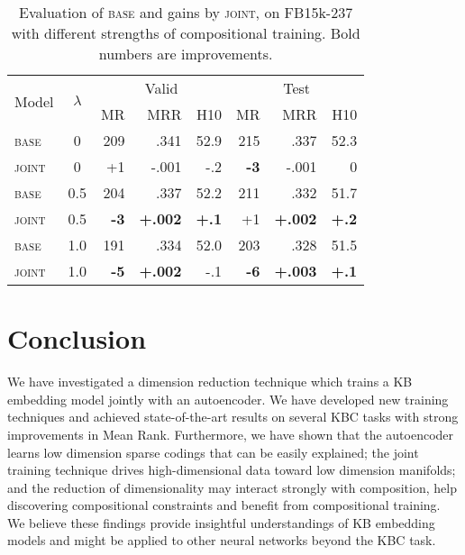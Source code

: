 \documentclass[11pt,a4paper]{article}
\begin{document}



\begin{table}[!t]
\centering
\setlength{\tabcolsep}{5pt}
\small
\begin{tabular}{@{}lcrrrrrr@{}}
\toprule
\multirow{2}{*}{Model} & \multirow{2}{*}{$\lambda$} & \multicolumn{3}{c}{Valid} & \multicolumn{3}{c}{Test} \\
\cmidrule(lr){3-5} \cmidrule(l){6-8}
& & MR & MRR & H10 & MR & MRR & H10 \\
\midrule
\textsc{base}  & 0 & 209 & .341 & 52.9 & 215 & .337 & 52.3 \\ %
\textsc{joint} & 0 & +1 & -.001 & -.2 & \textbf{-3} & -.001 & 0 \\ %
\midrule
\textsc{base}  & 0.5 & 204 & .337 & 52.2 & 211 & .332 & 51.7 \\ %
\textsc{joint} & 0.5 & \textbf{-3} & \textbf{+.002} & \textbf{+.1} & +1 & \textbf{+.002} & \textbf{+.2} \\ %
\midrule
\textsc{base}  & 1.0 & 191 & .334 & 52.0 & 203 & .328 & 51.5 \\ %
\textsc{joint} & 1.0 & \textbf{-5} & \textbf{+.002} & -.1 & \textbf{-6} & \textbf{+.003} & \textbf{+.1} \\ %
\bottomrule
\end{tabular}
\caption{%
Evaluation of \textsc{base} and gains by \textsc{joint}, on FB15k-237 
with different strengths of compositional training. Bold numbers are improvements.}
\label{tab:ablation-ae-comp}
\end{table}

\section{Conclusion}

We have investigated a dimension reduction technique which trains a KB embedding model jointly with an autoencoder. 
We have developed new training techniques and achieved 
state-of-the-art results on 
several KBC tasks with strong improvements in Mean Rank. 
Furthermore, we have shown that the autoencoder learns low dimension sparse 
codings that can be easily explained; the joint training technique 
drives high-dimensional data toward low dimension manifolds; and the 
reduction of dimensionality may interact strongly 
with composition, help discovering compositional constraints 
and benefit from compositional training. 
We believe these findings provide insightful understandings of KB embedding models and might be applied to other neural networks beyond the KBC task.
\end{document}
